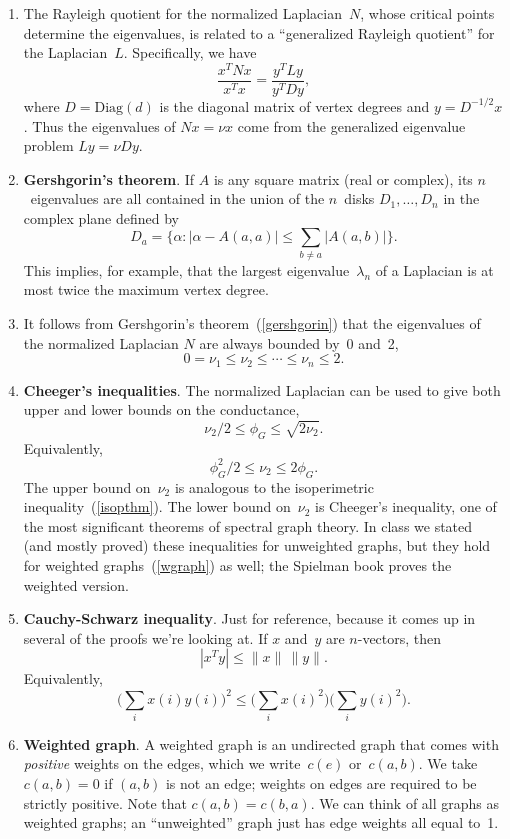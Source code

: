 \documentclass[11pt]{article}
\newcommand{\Diag}{\mbox{Diag}}
\begin{document}
\begin{enumerate}
\item\label{nlaprq}
The Rayleigh quotient for the normalized Laplacian~$N$, 
whose critical points determine the eigenvalues,
is related to a ``generalized Rayleigh quotient'' for the Laplacian~$L$.
Specifically, we have
$$\frac{x^TNx}{x^Tx} = \frac{y^TLy}{y^TDy},$$
where $D=\Diag(d)$ is the diagonal matrix of vertex degrees 
and $y=D^{-1/2}x$.
Thus the eigenvalues of $Nx=\nu x$ come from
the generalized eigenvalue problem $Ly=\nu Dy.$

\item\label{gershgorin}{\bf Gershgorin's theorem}.
If $A$ is any square matrix (real or complex), its $n$~eigenvalues are all contained
in the union of the $n$~disks $D_1,\ldots,D_n$ in the complex plane defined by
$$D_a = \{\alpha : |\alpha-A(a,a)| \leq \sum_{b\neq a}|A(a,b)|\}.$$
This implies, for example, that the largest eigenvalue~$\lambda_n$ of a Laplacian
is at most twice the maximum vertex degree.

\item
It follows from Gershgorin's theorem~(\ref{gershgorin}) that
the eigenvalues of the normalized Laplacian $N$ are always bounded by~0 and~2,
$$0 = \nu_1 \leq \nu_2 \leq \cdots \leq \nu_n \leq 2.$$

\item\label{cheeger} {\bf Cheeger's inequalities}.
The normalized Laplacian can be used to give both 
upper and lower bounds on the conductance,
$$\nu_2/2 \leq \phi_G \leq \sqrt{2\nu_2}.$$
Equivalently,
$$\phi_G^2/2 \leq \nu_2 \leq 2\phi_G.$$
The upper bound on~$\nu_2$ is analogous to the
isoperimetric inequality~(\ref{isopthm}).
The lower bound on~$\nu_2$ is Cheeger's inequality,
one of the most significant theorems of spectral
graph theory.
In class we stated (and mostly proved) these
inequalities for unweighted graphs, but they 
hold for weighted graphs~(\ref{wgraph}) as well; 
the Spielman book proves the weighted version.

\item\label{csi} {\bf Cauchy-Schwarz inequality}.
Just for reference, because it comes up in several of
the proofs we're looking at.  
If $x$ and~$y$ are $n$-vectors, then 
$$|x^Ty| \leq \|x\|\,\|y\|.$$
Equivalently,
$$\Big(\sum_i x(i)y(i)\Big)^2 \leq 
\Big(\sum_i x(i)^2\Big)
\Big(\sum_i y(i)^2\Big).$$

\item\label{wgraph}{\bf Weighted graph}.
A weighted graph is an undirected graph that comes 
with {\em positive} weights on the edges, which we write~$c(e)$ or~$c(a,b)$.
We take $c(a,b)=0$ if $(a,b)$ is not an edge; 
weights on edges are required to be strictly positive.
Note that $c(a,b)=c(b,a)$.
We can think of all graphs as weighted graphs;
an ``unweighted'' graph just has edge weights all equal to~1.


\end{enumerate}
\end{document}
